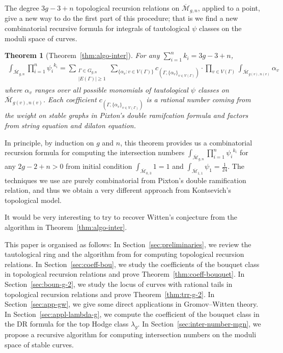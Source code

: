 \documentclass[12pt,reqno]{amsart}
\theoremstyle{plain}
\newtheorem{theorem}{Theorem}
\theoremstyle{definition}
\theoremstyle{remark}
\begin{document}
The degree $3g-3+n$ topological recursion relations on $\overline{\mathcal{M}}_{g,n}$, applied to a point, give a new way to do the first
part of this procedure; that is we find a  new combinatorial recursive  formula for integrals
of tautological $\psi$ classes on the moduli space of curves. 
\begin{theorem}
[Theorem~\ref{thm:algo-inter}]
 For any $\sum_{i=1}^{n}k_i=3g-3+n$,
\begin{align*}
\int_{\overline{\mathcal{M}}_{g,n}}  \prod_{i=1}^{n}{\psi_i}^{k_i}   =\sum_{\substack{\Gamma\in G_{g,n}\\ |E(\Gamma)|\geq1}}\sum_{\{\alpha_v:v\in V(\Gamma)\}} c_{(\Gamma,\{\alpha_v\}_{v\in V(\Gamma)})}\cdot \prod_{v\in V(\Gamma)}\int_{\overline{\mathcal{M}}_{g(v),n(v)}}\alpha_{v}  
\end{align*}
where $\alpha_v$ ranges over all possible  monomials of tautological $\psi$ classes on $\overline{\mathcal{M}}_{g(v),n(v)}$. Each coefficient $c_{(\Gamma,\{\alpha_v\}_{v\in V(\Gamma)})}$ is a rational number coming from the weight on stable graphs in Pixton's double ramifcation formula and factors from string equation and dilaton equation.        
\end{theorem}
In principle, by induction on  $g$ and $n$, this theorem provides us a combinatorial recursion formula for computing the intersection numbers $\int_{\overline{\mathcal{M}}_{g,n}} \prod_{i=1}^{n}{\psi_i}^{k_i}$ for any $2g-2+n>0$ from initial condition $ \int_{\overline{\mathcal{M}}_{0,3}}1=1$ and $\int_{\overline{\mathcal{M}}_{1,1}}\psi_1=\frac{1}{24}$.
The techniques we use are purely  combinatorial from Pixton's double ramification relation, and thus we obtain  a very different approach from Kontsevich's topological model.

It would be very interesting to try to recover Witten's conjecture from the algorithm in Theorem~\ref{thm:algo-inter}.

\medskip 

This paper is organised as follows:
In Section~\ref{sec:preliminaries}, we review the tautological ring and the algorithm from \cite{clader2023topological} for computing topological recursion relations.
In Section~\ref{sec:coeff-bou}, we study the coefficients of the bouquet class in topological  recursion relations and prove Theorem~\ref{thm:coeff-bouquet}.
In Section~\ref{sec:boun-g-2}, we study the locus of curves with rational tails in topological  recursion relations and prove Theorem~\ref{thm:trr-g-2}.
In Section~\ref{sec:app-gw},  we give some direct applications in Gromov--Witten theory.
In Section~\ref{sec:appl-lambda-g}, we compute the coefficient of the bouquet class in the DR formula for the top Hodge class $\lambda_g$.
In Section~\ref{sec:inter-number-mgn}, we propose a recursive algorithm for  computing intersection numbers on the moduli space of stable curves.
\end{document}
